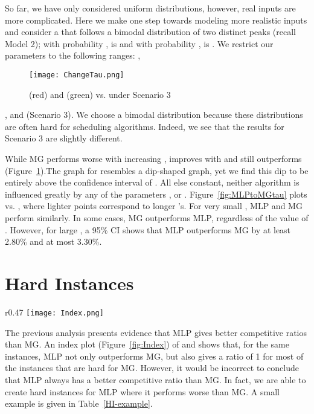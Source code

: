 \documentclass[oribibl]{llncs}
\begin{document}
So far, we have only considered uniform distributions, however, real
inputs are more complicated.  Here we make one step towards
modeling more realistic inputs and consider a 
 that follows a bimodal distribution of two distinct peaks (recall Model 2); with probability
,  is  and with probability ,  is
. We restrict our parameters to the following ranges: , 

\begin{figure}[hb]\centering 
\vspace{-20pt}
\texttt{[image: ChangeTau.png]}
\caption{(red) and (green) vs.  under Scenario 3}
\label{fig:ChangeTau}
\end{figure}
 \noindent
,  and  (Scenario 3). 
We choose a bimodal distribution because these distributions are often
hard for scheduling algorithms.  Indeed, we see that the
results for Scenario 3 are slightly
different.

While MG performs worse with increasing , 
improves with  and still outperforms 
(Figure~\ref{fig:ChangeTau}).The graph for  resembles a
dip-shaped graph, yet we find this dip to be entirely above the
confidence interval of . All else constant, neither
algorithm is influenced greatly by any of the parameters ,
 or .  Figure~\ref{fig:MLPtoMGtau} plots 
vs. , where lighter points correspond to longer 's. For
very small , MLP and MG perform similarly. In some cases, MG
outperforms MLP, regardless of the value of . However, for large
, a 95\% CI shows that MLP outperforms MG by at least 2.80\%
and at most 3.30\%.

\section{Hard Instances}
\label{sec:HI}
\begin{wrapfigure}[13]{r}{0.47\linewidth}
\vspace{-40pt}
\texttt{[image: Index.png]} 
\caption{Index plot of (red) and (green)}
\label{fig:Index}
\end{wrapfigure}

The previous analysis presents evidence  that MLP gives better
competitive ratios than MG.
An index plot
(Figure~\ref{fig:Index}) of  and  shows that,
for the same instances, MLP not only outperforms MG, but also gives a
ratio of 1 for most of the instances that are hard for MG.  
However, it would be incorrect to conclude that MLP always has a
better competitive ratio than MG.  In fact, 
we are able to
create hard instances for MLP where it performs worse than MG. A small 
example is given in Table~\ref{HI-example}.
\end{document}
